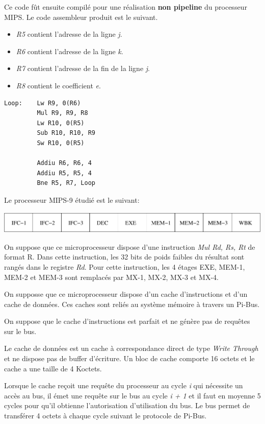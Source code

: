 Ce code f\^ut ensuite compil\'e pour une r\'ealisation \textbf{non pipeline}
du processeur MIPS. Le code assembleur produit est le suivant.

\begin{itemize}
  \item
    \textit{R5} contient l'adresse de la ligne \textit{j}.
  \item
    \textit{R6} contient l'adresse de la ligne \textit{k}.
  \item
    \textit{R7} contient l'adresse de la fin de la ligne \textit{j}.
  \item
    \textit{R8} contient le coefficient \textit{e}.
\end{itemize}

\begin{verbatim}
Loop:    Lw R9, 0(R6)
         Mul R9, R9, R8
         Lw R10, 0(R5)
         Sub R10, R10, R9
         Sw R10, 0(R5)

         Addiu R6, R6, 4
         Addiu R5, R5, 4
         Bne R5, R7, Loop
\end{verbatim}

Le processeur MIPS-9 \'etudi\'e est le suivant:

\begin{center}
  \includegraphics[scale=0.6]{figures/pipeline.pdf}
\end{center}

On suppose que ce microprocesseur dispose d'une instruction
\textit{Mul Rd, Rs, Rt} de format R. Dans cette instruction, les 32 bits
de poids faibles du r\'esultat sont rang\'es dans le registre \textit{Rd}.
Pour cette instruction, les 4 \'etages EXE, MEM-1, MEM-2 et MEM-3 sont
remplac\'es par MX-1, MX-2, MX-3 et MX-4.

On supposse que ce microprocesseur dispose d'un cache d'instructions et d'un
cache de donn\'ees. Ces caches sont reli\'es au syst\`eme m\'emoire \`a
travers un Pi-Bus.

On suppose que le cache d'instructions est parfait et ne g\'en\`ere pas de
requ\^etes sur le bus.

Le cache de donn\'ees est un cache \`a correspondance direct de type
\textit{Write Through} et ne dispose pas de buffer d'\'ecriture. Un bloc
de cache comporte 16 octets et le cache a une taille de 4 Koctets.

Lorsque le cache re\c{c}oit une requ\^ete du processeur au cycle \textit{i}
qui n\'ecessite un acc\`es au bus, il \'emet une requ\^ete sur le bus au
cycle \textit{i + 1} et il faut en moyenne 5 cycles pour qu'il obtienne
l'autorisation d'utilisation du bus. Le bus permet de transf\'erer 4 octets
\`a chaque cycle suivant le protocole de Pi-Bus.

